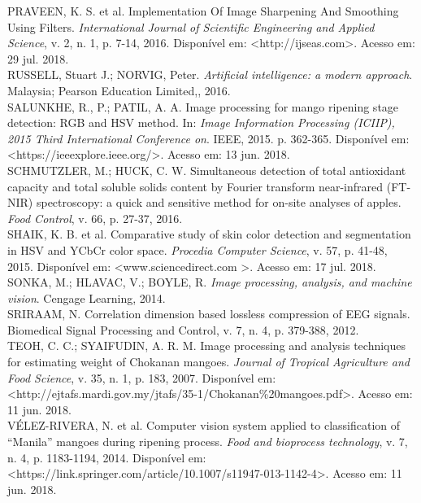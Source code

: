 \noindent PRAVEEN, K. S. et al. Implementation Of Image Sharpening And Smoothing Using Filters. \textit{International Journal of Scientific Engineering and Applied Science}, v. 2, n. 1, p. 7-14, 2016. Disponível em: <http://ijseas.com>. Acesso em: 29 jul. 2018.
\\

\noindent RUSSELL, Stuart J.; NORVIG, Peter. \textit{Artificial intelligence: a modern approach}. Malaysia; Pearson Education Limited,, 2016.
\\

\noindent SALUNKHE, R., P.; PATIL, A. A. Image processing for mango ripening stage detection: RGB and HSV method. In: \textit{Image Information Processing (ICIIP), 2015 Third International Conference on}. IEEE, 2015. p. 362-365. Disponível em: <https://ieeexplore.ieee.org/>. Acesso em: 13 jun. 2018.
\\

\noindent SCHMUTZLER, M.; HUCK, C. W. Simultaneous detection of total antioxidant capacity and total soluble solids content by Fourier transform near-infrared (FT-NIR) spectroscopy: a quick and sensitive method for on-site analyses of apples. \textit{Food Control}, v. 66, p. 27-37, 2016.
\\

\noindent SHAIK, K. B. et al. Comparative study of skin color detection and segmentation in HSV and YCbCr color space. \textit{Procedia Computer Science}, v. 57, p. 41-48, 2015. Disponível em: <www.sciencedirect.com >. Acesso em: 17 jul. 2018.
\\

\noindent SONKA, M.; HLAVAC, V.; BOYLE, R. \textit{Image processing, analysis, and machine vision}. Cengage Learning, 2014.
\\

\noindent SRIRAAM, N. Correlation dimension based lossless compression of EEG signals. Biomedical Signal Processing and Control, v. 7, n. 4, p. 379-388, 2012.
\\

\noindent TEOH, C. C.; SYAIFUDIN, A. R. M. Image processing and analysis techniques for estimating weight of Chokanan mangoes. \textit{Journal of Tropical Agriculture and Food Science}, v. 35, n. 1, p. 183, 2007. Disponível em: <http://ejtafs.mardi.gov.my/jtafs/35-1/Chokanan\%20mangoes.pdf>. Acesso em: 11 jun. 2018.
\\

\noindent VÉLEZ-RIVERA, N. et al. Computer vision system applied to classification of “Manila” mangoes during ripening process. \textit{Food and bioprocess technology}, v. 7, n. 4, p. 1183-1194, 2014. Disponível em: <https://link.springer.com/article/10.1007/s11947-013-1142-4>. Acesso em: 11 jun. 2018.
\\

